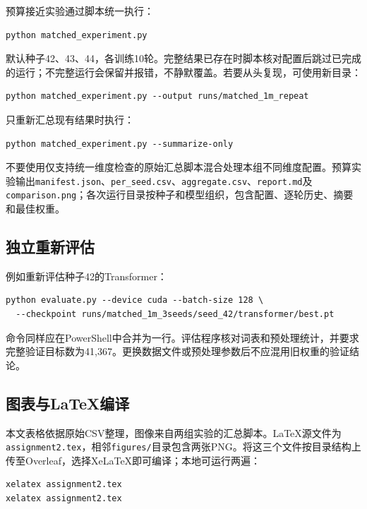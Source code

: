 ﻿\documentclass[UTF8,a4paper,12pt]{ctexart}
\begin{document}
预算接近实验通过脚本统一执行：
\begin{verbatim}
python matched_experiment.py
\end{verbatim}
默认种子42、43、44，各训练10轮。完整结果已存在时脚本核对配置后跳过已完成的运行；不完整运行会保留并报错，不静默覆盖。若要从头复现，可使用新目录：
\begin{verbatim}
python matched_experiment.py --output runs/matched_1m_repeat
\end{verbatim}
只重新汇总现有结果时执行：
\begin{verbatim}
python matched_experiment.py --summarize-only
\end{verbatim}
不要使用仅支持统一维度检查的原始汇总脚本混合处理本组不同维度配置。预算实验输出\nolinkurl{manifest.json}、\nolinkurl{per_seed.csv}、\nolinkurl{aggregate.csv}、\nolinkurl{report.md}及\nolinkurl{comparison.png}；各次运行目录按种子和模型组织，包含配置、逐轮历史、摘要和最佳权重。

\subsection{独立重新评估}
例如重新评估种子42的Transformer：
\begin{verbatim}
python evaluate.py --device cuda --batch-size 128 \
  --checkpoint runs/matched_1m_3seeds/seed_42/transformer/best.pt
\end{verbatim}
命令同样应在PowerShell中合并为一行。评估程序核对词表和预处理统计，并要求完整验证目标数为41,367。更换数据文件或预处理参数后不应混用旧权重的验证结论。

\subsection{图表与LaTeX编译}
本文表格依据原始CSV整理，图像来自两组实验的汇总脚本。LaTeX源文件为\nolinkurl{assignment2.tex}，相邻\nolinkurl{figures/}目录包含两张PNG。将这三个文件按目录结构上传至Overleaf，选择XeLaTeX即可编译；本地可运行两遍：
\begin{verbatim}
xelatex assignment2.tex
xelatex assignment2.tex
\end{verbatim}
\end{document}
